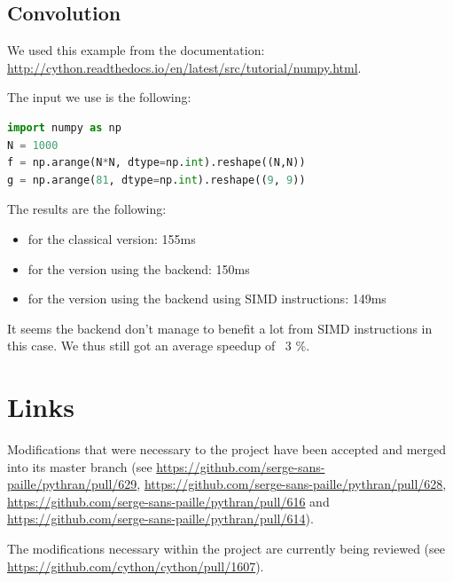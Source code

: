 \documentclass{deliverablereport}
\begin{document}
\subsection{Convolution}

We used this example from the \Cython documentation:
\url{http://cython.readthedocs.io/en/latest/src/tutorial/numpy.html}.

The input we use is the following:

\begin{lstlisting}[language=python]
import numpy as np
N = 1000
f = np.arange(N*N, dtype=np.int).reshape((N,N))
g = np.arange(81, dtype=np.int).reshape((9, 9))
\end{lstlisting}

The results are the following:

\begin{itemize}
  \item for the classical \Cython version: 155ms
  \item for the \Cython version using the \Pythran backend: 150ms
  \item for the \Cython version using the \Pythran backend using SIMD instructions: 149ms
\end{itemize}

It seems the \Pythran backend don't manage to benefit a lot from SIMD
instructions in this case. We thus still got an average speedup of ~3 \%.

\section{Links}
\label{sec:links}

Modifications that were necessary to the \Pythran project have been accepted and
merged into its master branch (see
\url{https://github.com/serge-sans-paille/pythran/pull/629},
\url{https://github.com/serge-sans-paille/pythran/pull/628},
\url{https://github.com/serge-sans-paille/pythran/pull/616} and
\url{https://github.com/serge-sans-paille/pythran/pull/614}).

The modifications necessary within the \Cython project are currently being reviewed
(see \url{https://github.com/cython/cython/pull/1607}).
\end{document}

